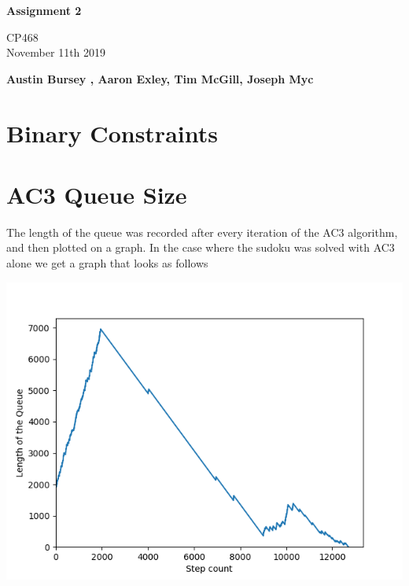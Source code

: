 \documentclass{article}
\begin{document}
\begin{titlepage}
  \pagestyle{fancy}
  \thispagestyle{fancy}
   \begin{center}
       \vspace*{1cm}
 
      \Huge
       \textbf{Assignment 2}
 
       \vspace{0.5cm}
       \Large
        CP468 \\ November 11th 2019
 
       \vspace{1.5cm}
 
       \textbf{Austin Bursey , Aaron Exley, Tim McGill, Joseph Myc}
 
       \vfill

 
       \vspace{0.8cm}
 
   \end{center}
\end{titlepage}
\setcounter{page}{2}

\section{Binary Constraints}

\section{AC3 Queue Size}

The length of the queue was recorded after every iteration of the AC3 algorithm, and then plotted on a graph.
\newline
In the case where the sudoku was solved with AC3 alone we get a graph that looks as follows

\includegraphics[scale=0.6]{Sudoku-Queue-length-plot-29.png}
\end{document}
